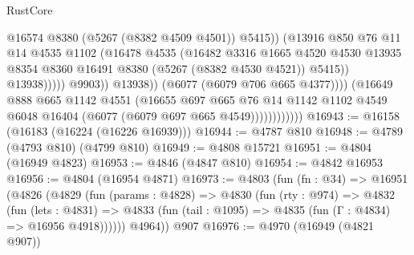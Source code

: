 \begin{lexlean}{RustCore}
\begin{coremodule}
                                            @16574
                                            @8380
                                            (@5267 (@8382 @4509 @4501))
                                            @5415))
                                        (@13916
                                          @850
                                          @76
                                          @11
                                          @14
                                          @4535
                                          @1102
                                          (@16478
                                            @4535
                                            (@16482
                                              @3316
                                              @1665
                                              @4520
                                              @4530
                                              @13935
                                              @8354
                                              @8360
                                              @16491
                                              @8380
                                              (@5267 (@8382 @4530 @4521))
                                              @5415))
                                          @13938)))))
                                @9903))
                            @13938))
                        (@6077 (@6079 @706 @665 @4377))))
                    (@16649
                      @888
                      @665
                      @1142
                      @4551
                      (@16655
                        @697
                        @665
                        @76
                        @14
                        @1142
                        @1102
                        @4549
                        @6048
                        @16404
                        (@6077 (@6079 @697 @665 @4549))))))))))))
@16943 := @16158 (@16183 (@16224 (@16226 @16939)))
@16944 := @4787 @810
@16948 := @4789 (@4793 @810) (@4799 @810)
@16949 := @4808 @15721
@16951 := @4804 (@16949 @4823)
@16953 := @4846 (@4847 @810)
@16954 := @4842 @16953
@16956 := @4804 (@16954 @4871)
@16973 := @4803
    (fun (fn : @34) =>
    @16951
      (@4826
        (@4829
          (fun (params : @4828) =>
          @4830
            (fun (rty : @974) =>
            @4832
              (fun (lets : @4831) =>
              @4833 (fun (tail : @1095) => @4835 (fun (Γ : @4834) => @16956 @4918))))))
        @4964))
    @907
@16976 := @4970 (@16949 (@4821 @907))

\end{coremodule}
\end{lexlean}
